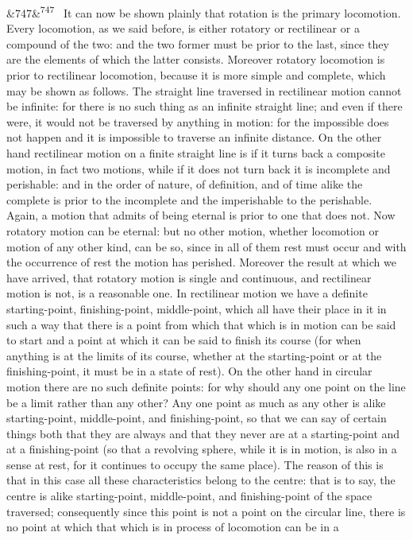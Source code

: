 \documentclass[12pt]{article}
\newcommand{\para}[1][]{\par\noindent\ifx&#1&\else\textsuperscript{\footnotesize #1}~\fi}
\begin{document}
\para[747] It can now be shown plainly that rotation is the primary locomotion. Every locomotion, as we said before, is either rotatory or rectilinear or a compound of the two: and the two former must be prior to the last, since they are the elements of which the latter consists. Moreover rotatory locomotion is prior to rectilinear locomotion, because it is more simple and complete, which may be shown as follows. The straight line traversed in rectilinear motion cannot be infinite: for there is no such thing as an infinite straight line; and even if there were, it would not be traversed by anything in motion: for the impossible does not happen and it is impossible to traverse an infinite distance. On the other hand rectilinear motion on a finite straight line is if it turns back a composite motion, in fact two motions, while if it does not turn back it is incomplete and perishable: and in the order of nature, of definition, and of time alike the complete is prior to the incomplete and the imperishable to the perishable. Again, a motion that admits of being eternal is prior to one that does not. Now rotatory motion can be eternal: but no other motion, whether locomotion or motion of any other kind, can be so, since in all of them rest must occur and with the occurrence of rest the motion has perished. Moreover the result at which we have arrived, that rotatory motion is single and continuous, and rectilinear motion is not, is a reasonable one. In rectilinear motion we have a definite starting-point, finishing-point, middle-point, which all have their place in it in such a way that there is a point from which that which is in motion can be said to start and a point at which it can be said to finish its course (for when anything is at the limits of its course, whether at the starting-point or at the finishing-point, it must be in a state of rest). On the other hand in circular motion there are no such definite points: for why should any one point on the line be a limit rather than any other? Any one point as much as any other is alike starting-point, middle-point, and finishing-point, so that we can say of certain things both that they are always and that they never are at a starting-point and at a finishing-point (so that a revolving sphere, while it is in motion, is also in a sense at rest, for it continues to occupy the same place). The reason of this is that in this case all these characteristics belong to the centre: that is to say, the centre is alike starting-point, middle-point, and finishing-point of the space traversed; consequently since this point is not a point on the circular line, there is no point at which that which is in process of locomotion can be in a
\end{document}
